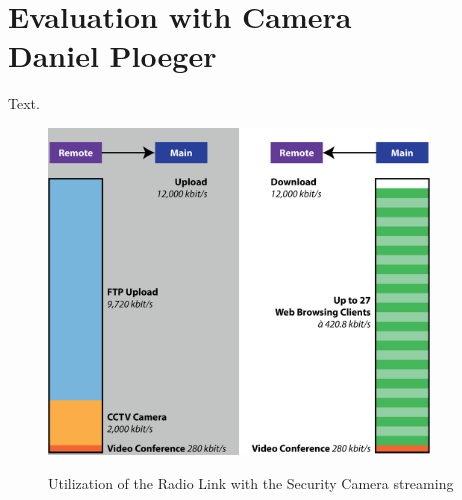 \documentclass[a4paper,10pt]{book}\usepackage{graphicx}
\begin{document}
\chapter{Evaluation with Camera\\ {\large Daniel Ploeger}}

Text.

\begin{figure}[!ht]
  \centering
    \includegraphics[width=0.9\textwidth]{graphics-01.eps}
    \label{fig:g1}
    \caption{Utilization of the Radio Link with the Security Camera streaming}
\end{figure}
\end{document}
